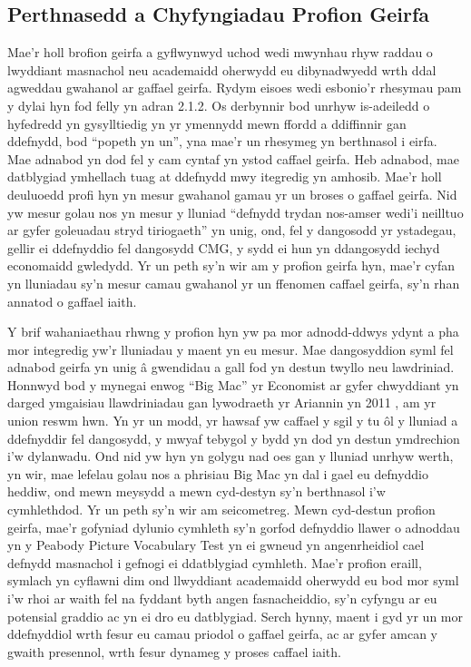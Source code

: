 \subsection{Perthnasedd a Chyfyngiadau Profion Geirfa}
Mae’r holl brofion geirfa a gyflwynwyd uchod wedi mwynhau rhyw raddau o lwyddiant masnachol neu academaidd oherwydd eu dibynadwyedd wrth ddal agweddau gwahanol ar gaffael geirfa. Rydym eisoes wedi esbonio'r rhesymau pam y dylai hyn fod felly yn adran 2.1.2. Os derbynnir bod unrhyw is-adeiledd o hyfedredd yn gysylltiedig yn yr ymennydd mewn ffordd a ddiffinnir gan ddefnydd, bod ``popeth yn un'', yna mae'r un rhesymeg yn berthnasol i eirfa. Mae adnabod yn dod fel y cam cyntaf yn ystod caffael geirfa. Heb adnabod, mae datblygiad ymhellach tuag at ddefnydd mwy itegredig yn amhosib. Mae'r holl deuluoedd profi hyn yn mesur gwahanol gamau yr un broses o gaffael geirfa. Nid yw mesur golau nos yn mesur y lluniad ``defnydd trydan nos-amser wedi'i neilltuo ar gyfer goleuadau stryd tiriogaeth'' yn unig, ond, fel y dangosodd yr ystadegau, gellir ei ddefnyddio fel dangosydd CMG, y sydd ei hun yn ddangosydd iechyd economaidd gwledydd. Yr un peth sy'n wir am y profion geirfa hyn, mae'r cyfan yn lluniadau sy'n mesur camau gwahanol yr un ffenomen caffael geirfa, sy'n rhan annatod o gaffael iaith.

Y brif wahaniaethau rhwng y profion hyn yw pa mor adnodd-ddwys ydynt a pha mor integredig yw'r lluniadau y maent yn eu mesur. Mae dangosyddion syml fel adnabod geirfa yn unig â gwendidau a gall fod yn destun twyllo neu lawdriniad. Honnwyd bod y mynegai enwog ``Big Mac'' yr Economist ar gyfer chwyddiant yn darged ymgaisiau llawdriniadau gan lywodraeth yr Ariannin yn 2011 \parencite{politi_argentinas_2011}, am yr union reswm hwn. Yn yr un modd, yr hawsaf yw caffael y sgil y tu ôl y lluniad a ddefnyddir fel dangosydd, y mwyaf tebygol y bydd yn dod yn destun ymdrechion i'w dylanwadu. Ond nid yw hyn yn golygu nad oes gan y lluniad unrhyw werth, yn wir, mae lefelau golau nos a phrisiau Big Mac yn dal i gael eu defnyddio heddiw, ond mewn meysydd a mewn cyd-destyn sy'n berthnasol i'w cymhlethdod. Yr un peth sy'n wir am seicometreg. Mewn cyd-destun profion geirfa, mae’r gofyniad dylunio cymhleth sy’n gorfod defnyddio llawer o adnoddau yn y Peabody Picture Vocabulary Test yn ei gwneud yn angenrheidiol cael defnydd masnachol i gefnogi ei ddatblygiad cymhleth. Mae'r profion eraill, symlach yn cyflawni dim ond llwyddiant academaidd oherwydd eu bod mor syml i'w rhoi ar waith fel na fyddant byth angen fasnacheiddio, sy'n cyfyngu ar eu potensial graddio ac yn ei dro eu datblygiad. Serch hynny, maent i gyd yr un mor ddefnyddiol wrth fesur eu camau priodol o gaffael geirfa, ac ar gyfer amcan y gwaith presennol, wrth fesur dynameg y proses caffael iaith.

